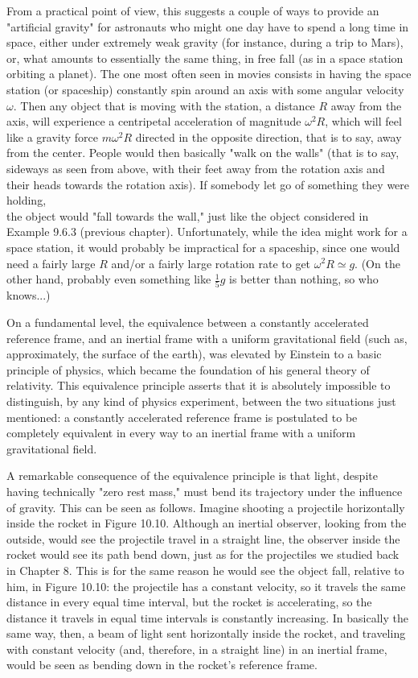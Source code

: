 \documentclass[10pt]{article}
\begin{document}
From a practical point of view, this suggests a couple of ways to provide an "artificial gravity" for astronauts who might one day have to spend a long time in space, either under extremely weak gravity (for instance, during a trip to Mars), or, what amounts to essentially the same thing, in free fall (as in a space station orbiting a planet). The one most often seen in movies consists in having the space station (or spaceship) constantly spin around an axis with some angular velocity $\omega$. Then any object that is moving with the station, a distance $R$ away from the axis, will experience a centripetal acceleration of magnitude $\omega^{2} R$, which will feel like a gravity force $m \omega^{2} R$ directed in the opposite direction, that is to say, away from the center. People would then basically "walk on the walls" (that is to say, sideways as seen from above, with their feet away from the rotation axis and their heads towards the rotation axis). If somebody let go of something they were holding,\\
the object would "fall towards the wall," just like the object considered in Example 9.6.3 (previous chapter). Unfortunately, while the idea might work for a space station, it would probably be impractical for a spaceship, since one would need a fairly large $R$ and/or a fairly large rotation rate to get $\omega^{2} R \simeq g$. (On the other hand, probably even something like $\frac{1}{5} g$ is better than nothing, so who knows...)

On a fundamental level, the equivalence between a constantly accelerated reference frame, and an inertial frame with a uniform gravitational field (such as, approximately, the surface of the earth), was elevated by Einstein to a basic principle of physics, which became the foundation of his general theory of relativity. This equivalence principle asserts that it is absolutely impossible to distinguish, by any kind of physics experiment, between the two situations just mentioned: a constantly accelerated reference frame is postulated to be completely equivalent in every way to an inertial frame with a uniform gravitational field.

A remarkable consequence of the equivalence principle is that light, despite having technically "zero rest mass," must bend its trajectory under the influence of gravity. This can be seen as follows. Imagine shooting a projectile horizontally inside the rocket in Figure 10.10. Although an inertial observer, looking from the outside, would see the projectile travel in a straight line, the observer inside the rocket would see its path bend down, just as for the projectiles we studied back in Chapter 8. This is for the same reason he would see the object fall, relative to him, in Figure 10.10: the projectile has a constant velocity, so it travels the same distance in every equal time interval, but the rocket is accelerating, so the distance it travels in equal time intervals is constantly increasing. In basically the same way, then, a beam of light sent horizontally inside the rocket, and traveling with constant velocity (and, therefore, in a straight line) in an inertial frame, would be seen as bending down in the rocket's reference frame.
\end{document}
